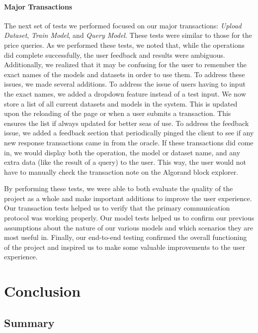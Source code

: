 \documentclass{article}
\begin{document}
    \paragraph{Major Transactions}
    The next set of tests we performed focused on our major transactions: \textit{Upload Dataset}, \textit{Train Model},
    and \textit{Query Model}.  These tests were similar to those for the price queries.  As we performed these tests, we
    noted that, while the operations did complete successfully, the user feedback and results were ambiguous.  Additionally,
    we realized that it may be confusing for the user to remember the exact names of the models and datasets in order to
    use them.  To address these issues, we made several additions.  To address the issue of users having to input the
    exact names, we added a dropdown feature instead of a test input.  We now store a list of all current datasets and
    models in the system.  This is updated upon the reloading of the page or when a user submits a transaction.  This
    ensures the list if always updated for better seas of use.  To address the feedback issue, we added a feedback section
    that periodically pinged the client to see if any new response transactions came in from the oracle.  If these
    transactions did come in, we would display both the operation, the model or dataset name, and any extra data (like
    the result of a query) to the user.  This way, the user would not have to manually check the transaction note on
    the Algorand block explorer.

    By performing these tests, we were able to both evaluate the quality of the project as a whole and make important
    additions to improve the user experience.  Our transaction tests helped us to verify that the primary communication
    protocol was working properly.  Our model tests helped us to confirm our previous assumptions about the nature of
    our various models and which scenarios they are most useful in.  Finally, our end-to-end testing confirmed the
    overall functioning of the project and inspired us to make some valuable improvements to the user experience.

    \section{Conclusion}

    \subsection{Summary}
\end{document}
